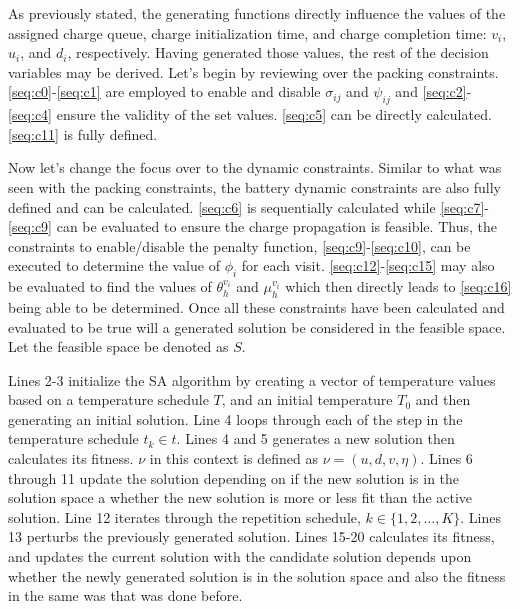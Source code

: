 \documentclass[11pt,a4paper,final]{article}
\newcommand{\Tau}{T}                        %
\begin{document}
As previously stated, the generating functions directly influence the values of the assigned charge queue, charge
initialization time, and charge completion time: \(v_i\), \(u_i\), and \(d_i\), respectively. Having generated those values,
the rest of the decision variables may be derived. Let's begin by reviewing over the packing constraints.
\ref{seq:c0}-\ref{seq:c1} are employed to enable and disable \(\sigma_{ij}\) and \(\psi_{ij}\) and \ref{seq:c2}-\ref{seq:c4} ensure
the validity of the set values. \ref{seq:c5} can be directly calculated. \ref{seq:c11} is fully defined.

Now let's change the focus over to the dynamic constraints. Similar to what was seen with the packing constraints, the
battery dynamic constraints are also fully defined and can be calculated. \ref{seq:c6} is sequentially calculated while
\ref{seq:c7}-\ref{seq:c9} can be evaluated to ensure the charge propagation is feasible. Thus, the constraints to
enable/disable the penalty function, \ref{seq:c9}-\ref{seq:c10}, can be executed to determine the value of \(\phi_i\) for
each visit. \ref{seq:c12}-\ref{seq:c15} may also be evaluated to find the values of \(\theta_h^{v_i}\) and \(\mu_h^{v_i}\) which
then directly leads to \ref{seq:c16} being able to be determined. Once all these constraints have been calculated and
evaluated to be true will a generated solution be considered in the feasible space. Let the feasible space be denoted as
\(S\).

Lines 2-3 initialize the SA algorithm by creating a vector of temperature values based on a temperature schedule \(\Tau\),
and an initial temperature \(\Tau_0\) and then generating an initial solution. Line 4 loops through each of the step in
the temperature schedule \(t_k \in t\). Lines 4 and 5 generates a new solution then calculates its fitness. \(\nu\) in this
context is defined as \(\nu = (u, d, v, \eta)\). Lines 6 through 11 update the solution depending on if the new solution is in
the solution space a whether the new solution is more or less fit than the active solution. Line 12 iterates through the
repetition schedule, \(k \in \{1, 2, ..., K\}\). Lines 13 perturbs the previously generated solution. Lines 15-20 calculates
its fitness, and updates the current solution with the candidate solution depends upon whether the newly generated
solution is in the solution space and also the fitness in the same was that was done before.
\end{document}
